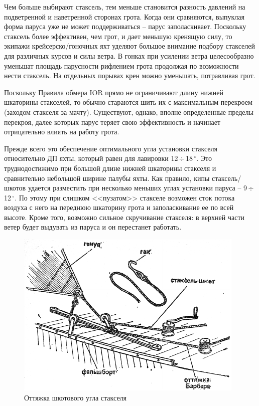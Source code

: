\documentclass[a4paper, 12pt, twoside, final, book, russian, fittopage, cyremdash]{ncc}
\newcommand{\gr}{\ensuremath{\,^\circ}\xspace}
\newcommand{\otdo}{\,\ensuremath{\div}\,}
\begin{document}
Чем больше выбирают стаксель, тем меньше становится разность давлений на подветренной и наветренной сторонах грота. Когда они сравняются, выпуклая форма паруса уже не может поддерживаться \--- парус заполаскивает. Поскольку стаксель более эффективен, чем грот, и дает меньшую кренящую силу, то экипажи крейсерско\-/гоночных яхт уделяют большое внимание подбору стакселей для различных курсов и силы ветра. В гонках при усилении ветра целесообразно уменьшат площадь парусности рифлением грота продолжая по возможности нести стаксель. На отдельных порывах крен можно уменьшать, потравливая грот.

Поскольку Правила обмера IOR прямо не ограничивают длину нижней шкаторины стакселей, то обычно стараются шить их с максимальным перекроем (заходом стакселя за мачту). Существуют, однако, вполне определенные пределы перекроя, далее которых парус теряет свою эффективность и начинает отрицательно влиять на работу грота.

Прежде всего это обеспечение оптимального угла установки стакселя относительно ДП яхты, который равен для лавировки 12\otdo 18\gr. Это труднодостижимо при большой длине нижней шкаторины стакселя и сравнительно небольшой ширине палубы яхты. Как правило, кипы стаксель\-/шкотов удается разместить при несколько меньших углах установки паруса \--- 9\otdo 12\gr. По этому при слишком <<пузатом>> стакселе возможен сток потока воздуха с него на переднюю шкаторину грота и заполаскивание ее по всей высоте. Кроме того, возможно сильное скручивание стакселя: в верхней части ветер будет выдувать из паруса и он перестанет работать. 

\begin{figure}[htb]
  \centering
  \includegraphics[scale=1.2]{0030P}
  \caption{Оттяжка шкотового угла стакселя}
  \label{fig:30}
\end{figure}
\end{document}
